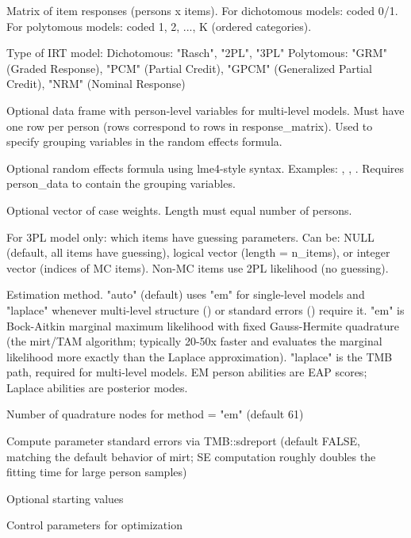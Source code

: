 \documentclass[a4paper]{book}
\begin{document}
%
\begin{Arguments}
\begin{ldescription}
\item[\code{response\_matrix}] Matrix of item responses (persons x items).
For dichotomous models: coded 0/1.
For polytomous models: coded 1, 2, ..., K (ordered categories).

\item[\code{model}] Type of IRT model:
Dichotomous: "Rasch", "2PL", "3PL"
Polytomous: "GRM" (Graded Response), "PCM" (Partial Credit),
"GPCM" (Generalized Partial Credit), "NRM" (Nominal Response)

\item[\code{person\_data}] Optional data frame with person-level variables for multi-level models.
Must have one row per person (rows correspond to rows in response\_matrix).
Used to specify grouping variables in the random effects formula.

\item[\code{random}] Optional random effects formula using lme4-style syntax.
Examples: , ,
.
Requires person\_data to contain the grouping variables.

\item[\code{weights}] Optional vector of case weights. Length must equal number of persons.

\item[\code{mc\_items}] For 3PL model only: which items have guessing parameters.
Can be: NULL (default, all items have guessing), logical vector (length = n\_items),
or integer vector (indices of MC items). Non-MC items use 2PL likelihood (no guessing).

\item[\code{method}] Estimation method. "auto" (default) uses "em" for
single-level models and "laplace" whenever multi-level structure
() or standard errors () require it.
"em" is Bock-Aitkin marginal maximum likelihood with fixed
Gauss-Hermite quadrature (the mirt/TAM algorithm; typically 20-50x
faster and evaluates the marginal likelihood more exactly than the
Laplace approximation). "laplace" is the TMB path, required for
multi-level models. EM person abilities are EAP scores; Laplace
abilities are posterior modes.

\item[\code{quad\_points}] Number of quadrature nodes for method = "em"
(default 61)

\item[\code{se}] Compute parameter standard errors via TMB::sdreport (default
FALSE, matching the default behavior of mirt; SE computation roughly
doubles the fitting time for large person samples)

\item[\code{start}] Optional starting values

\item[\code{control}] Control parameters for optimization
\end{ldescription}
\end{Arguments}
\end{document}
